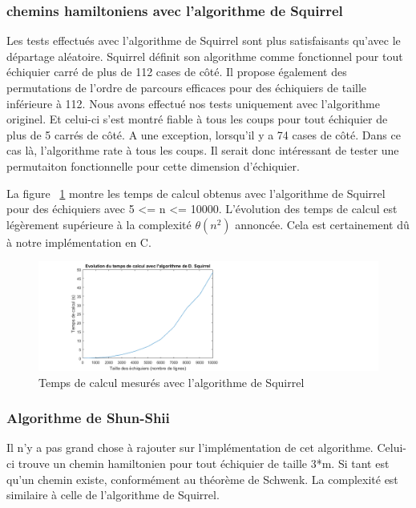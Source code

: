 \subsubsection{chemins hamiltoniens avec l'algorithme de Squirrel}
Les tests effectués avec l'algorithme de Squirrel sont plus satisfaisants qu'avec le départage aléatoire. Squirrel définit son algorithme comme fonctionnel pour tout échiquier carré de plus de 112 cases de côté. Il propose également des permutations de l'ordre de parcours efficaces pour des échiquiers de taille inférieure à 112. Nous avons effectué nos tests uniquement avec l'algorithme originel. Et celui-ci s'est montré fiable à tous les coups pour tout échiquier de plus de 5 carrés de côté. A une exception, lorsqu'il y a 74 cases de côté. Dans ce cas là, l'algorithme rate à tous les coups. Il serait donc intéressant de tester une permutaiton fonctionnelle pour cette dimension d'échiquier. 

La figure ~\ref{TempsSquirrel} montre les temps de calcul obtenus avec l'algorithme de Squirrel pour des échiquiers avec 5 <= n <= 10000. L'évolution des temps de calcul est légèrement supérieure à la complexité $\theta(n^2)$ annoncée. Cela est certainement dû à notre implémentation en C.
\begin{figure}[h]
\begin{center}
   \includegraphics[scale=0.6]{img/TempsSquirrel.png} 
   \caption{\label{TempsSquirrel} Temps de calcul mesurés avec l'algorithme de Squirrel}
   \end{center}
\end{figure}

\subsubsection{Algorithme de Shun-Shii}
Il n'y a pas grand chose à rajouter sur l'implémentation de cet algorithme. Celui-ci trouve un chemin hamiltonien pour tout échiquier de taille 3*m. Si tant est qu'un chemin existe, conformément au théorème de Schwenk. La complexité est similaire à celle de l'algorithme de Squirrel.
